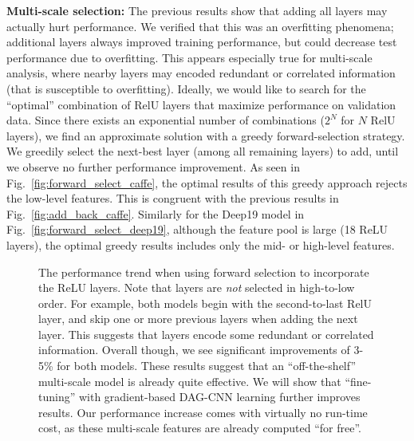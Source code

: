 \documentclass[10pt,twocolumn,letterpaper]{article}
\begin{document}
{\bf Multi-scale selection:} The previous results show that adding all layers may actually hurt performance. We verified that this was an overfitting phenomena; additional layers always improved training performance, but could decrease test performance due to overfitting. This appears especially true for multi-scale analysis, where nearby layers may encoded redundant or correlated information (that is susceptible to overfitting). Ideally, we would like to search for the ``optimal'' combination of RelU layers that maximize performance on validation data. Since there exists an exponential number of combinations ($2^N$ for $N$ RelU layers), we find an approximate solution with a greedy forward-selection strategy. We greedily select the next-best layer (among all remaining layers) to add, until we observe no further performance improvement. As seen in Fig.~\ref{fig:forward_select_caffe}, the optimal results of this greedy approach rejects the low-level features. This is congruent with the previous results in Fig.~\ref{fig:add_back_caffe}. Similarly for the Deep19 model in Fig.~\ref{fig:forward_select_deep19}, although the feature pool is large (18 ReLU layers), the optimal greedy results includes only the mid- or high-level features. 

\begin{figure}[htbp]
\centering
\caption{The performance trend when using forward selection to incorporate the ReLU layers. Note that layers are {\em not} selected in high-to-low order. For example, both models begin with the second-to-last RelU layer, and skip one or more previous layers when adding the next layer. This suggests that layers encode some redundant or correlated information. Overall though, we see significant improvements of 3-5\% for both models. These results suggest that an ``off-the-shelf'' multi-scale model is already quite effective. We will show that ``fine-tuning'' with gradient-based DAG-CNN learning further improves results. Our performance increase comes with virtually no run-time cost, as these multi-scale features are already computed ``for free''.}

\label{fig:forward_select}
\end{figure}
\end{document}
